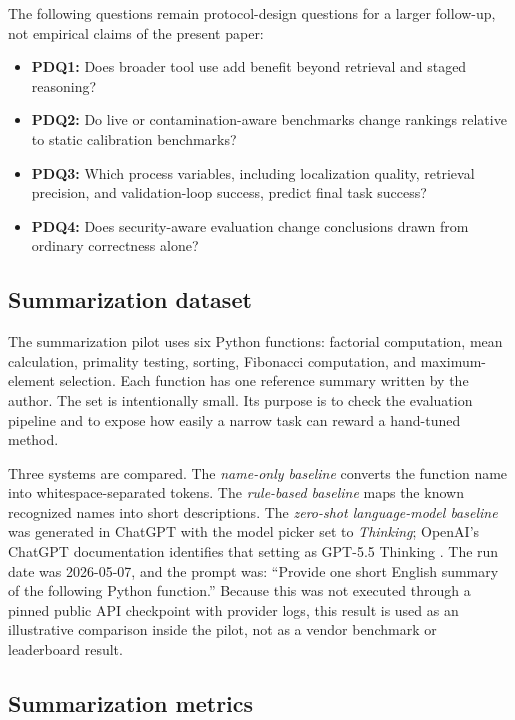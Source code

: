 \documentclass[preprint,12pt]{elsarticle}
\begin{document}
The following questions remain protocol-design questions for a larger follow-up, not empirical claims of the present paper:

\begin{itemize}[leftmargin=*]
    \item \textbf{PDQ1:} Does broader tool use add benefit beyond retrieval and staged reasoning?
    \item \textbf{PDQ2:} Do live or contamination-aware benchmarks change rankings relative to static calibration benchmarks?
    \item \textbf{PDQ3:} Which process variables, including localization quality, retrieval precision, and validation-loop success, predict final task success?
    \item \textbf{PDQ4:} Does security-aware evaluation change conclusions drawn from ordinary correctness alone?
\end{itemize}

\subsection{Summarization dataset}

The summarization pilot uses six Python functions: factorial computation, mean calculation, primality testing, sorting, Fibonacci computation, and maximum-element selection. Each function has one reference summary written by the author. The set is intentionally small. Its purpose is to check the evaluation pipeline and to expose how easily a narrow task can reward a hand-tuned method.

Three systems are compared. The \textit{name-only baseline} converts the function name into whitespace-separated tokens. The \textit{rule-based baseline} maps the known recognized names into short descriptions. The \textit{zero-shot language-model baseline} was generated in ChatGPT with the model picker set to \textit{Thinking}; OpenAI's ChatGPT documentation identifies that setting as GPT-5.5 Thinking \cite{openai2026gpt55}. The run date was 2026-05-07, and the prompt was: ``Provide one short English summary of the following Python function.'' Because this was not executed through a pinned public API checkpoint with provider logs, this result is used as an illustrative comparison inside the pilot, not as a vendor benchmark or leaderboard result.

\subsection{Summarization metrics}
\end{document}
